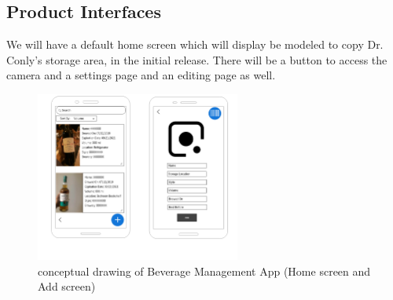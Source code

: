 \subsection{Product Interfaces}
We will have a default home screen which will display be modeled to copy Dr. Conly's storage area, in the initial release. There 
will be a button to access the camera and a settings page and an editing page as well.

\begin{figure}[h!]
	\centering
   	\includegraphics[width=0.60\textwidth]{images/CD.png}
    \caption{ conceptual drawing of Beverage Management App (Home screen and Add screen) }
\end{figure}